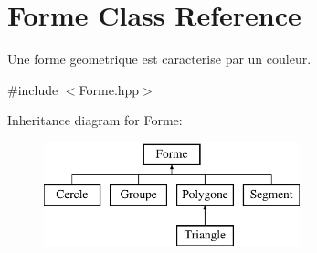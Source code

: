 \hypertarget{class_forme}{}\section{Forme Class Reference}
\label{class_forme}


Une forme geometrique est caracterise par un couleur.  




{\ttfamily \#include $<$Forme.\+hpp$>$}

Inheritance diagram for Forme\+:\begin{figure}[H]
\begin{center}
\leavevmode
\includegraphics[height=3.000000cm]{class_forme}
\end{center}
\end{figure}
